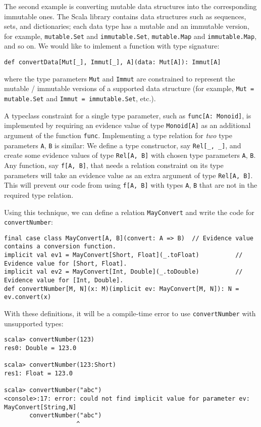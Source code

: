 The second example is converting mutable data structures into the
corresponding immutable ones. The Scala library contains data structures
such as sequences, sets, and dictionaries; each data type has a mutable
and an immutable version, for example, \lstinline!mutable.Set! and
\lstinline!immutable.Set!, \lstinline!mutable.Map! and \lstinline!immutable.Map!,
and so on. We would like to imlement a function with type signature:
\begin{lstlisting}
def convertData[Mut[_], Immut[_], A](data: Mut[A]): Immut[A]
\end{lstlisting}
where the type parameters \lstinline!Mut! and \lstinline!Immut!
are constrained to represent the mutable / immutable versions of a
supported data structure (for example, \lstinline!Mut = mutable.Set!
and \lstinline!Immut = immutable.Set!, etc.).

A typeclass constraint for a single type parameter, such as \lstinline!func[A: Monoid]!,
is implemented by requiring an evidence value
of type \lstinline!Monoid[A]! as an additional argument of the function
\lstinline!func!. Implementing a type relation for \emph{two} type
parameters \lstinline!A!, \lstinline!B! is similar: We define a
type constructor, say \lstinline!Rel[_, _]!, and create some evidence
values of type \lstinline!Rel[A, B]! with chosen type parameters
\lstinline!A!, \lstinline!B!. Any function, say \lstinline!f[A, B]!,
that needs a relation constraint on its type parameters will take
an evidence value as an extra argument of type \lstinline!Rel[A, B]!.
This will prevent our code from using \lstinline!f[A, B]! with types
\lstinline!A!, \lstinline!B! that are not in the required type relation. 

Using this technique, we can define a relation \lstinline!MayConvert!
and write the code for \lstinline!convertNumber!:
\begin{lstlisting}
final case class MayConvert[A, B](convert: A => B)  // Evidence value contains a conversion function.
implicit val ev1 = MayConvert[Short, Float](_.toFloat)          // Evidence value for [Short, Float].
implicit val ev2 = MayConvert[Int, Double](_.toDouble)          // Evidence value for [Int, Double].
def convertNumber[M, N](x: M)(implicit ev: MayConvert[M, N]): N = ev.convert(x)
\end{lstlisting}
With these definitions, it will be a compile-time error to use \lstinline!convertNumber!
with unsupported types:
\begin{lstlisting}
scala> convertNumber(123)
res0: Double = 123.0

scala> convertNumber(123:Short)
res1: Float = 123.0

scala> convertNumber("abc")
<console>:17: error: could not find implicit value for parameter ev: MayConvert[String,N]
       convertNumber("abc")
                    ^
\end{lstlisting}

